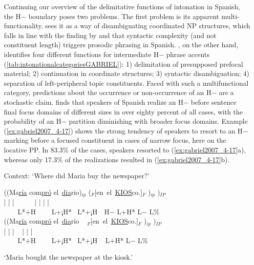 Continuing our overview of the delimitative functions of intonation in Spanish, the H$-$ boundary poses two problems. The first problem is its apparent multi-functionality. 
\citet{Nibert.1999} sees it as a way of 
disambiguating coordinated NP structures, which falls in line with the 
finding by \citet{DImperioElordietaFrotaPrietoVigario2005} and 
\citet{FrotaETAL.2007} that syntactic complexity (and not constituent 
length) triggers prosodic phrasing in Spanish. \citet[201]{Gabriel2007}, 
on the other hand, identifies four different functions for 
intermediate H$-$ phrase accents 
(\autoref{tab:intonationalcategoriesGABRIEL}): 1) delimitation of 
presupposed prefocal material; 2) continuation in coordinate structures; 
3) syntactic disambiguation; 4) separation of left-peripheral topic 
constituents. Faced with such a multifunctional category, predictions 
about the occurrence or non-occurrence of an H$-$ are a stochastic claim. \citet[276--282]{Gabriel2007} finds that 
speakers of Spanish realize an H$-$ before sentence final focus domains of 
different sizes in over eighty percent of all cases, with the probability 
of an H$-$ partition diminishing with broader focus 
domains. Example (\ref{ex:gabriel2007_4-17}) shows the strong tendency of speakers to 
resort to an H$-$ marking before a focused constituent in cases of 
narrow focus, here on the locative \ac{PP}. In 83.3\% of the cases, 
speakers resorted to (\ref{ex:gabriel2007_4-17}a), whereas only 17.3\% of 
the realizations resulted in (\ref{ex:gabriel2007_4-17}b).

\begin{exe}
\ex\label{ex:gabriel2007_4-17} Context: `Where did Maria buy the newspaper?'
\begin{xlist}
\ex
\glll ((Ma\underline{ría} com\underline{pró} el~\underline{dia}rio)$_{ip}$ ($_{F}$[en~el~\underline{KIOS}co.]$_{F}$ )$_{ip}$ )$_{IP}$ \\
\hspace{2em}|   \hspace{2.8em}|    \hspace{1em}|~~~~~~|  \hspace{4em}| | |\\
~~~~L*+H ~~~~L+¡H* ~L*+¡H~~H$-$ \hspace{3.75em}L+H* L$-$ L\% \\
\ex
\glll ((Ma\underline{ría} com\underline{pró} el~\underline{dia}rio ~ $_{F}$[en~el~\underline{KIOS}co.]$_{F}$ )$_{ip}$ )$_{IP}$~~ \\
\hspace{2em}|   \hspace{2.8em}|    \hspace{1em}| ~ \hspace{4em}| | |\\
~~~~L*+H ~~~~L+¡H* ~L*+¡H ~ \hspace{4em}L+H* L$-$ L\% \\
\end{xlist}
‘Maria bought the newspaper at the kiosk.’ \citep[278]{Gabriel2007}\\
\end{exe}

